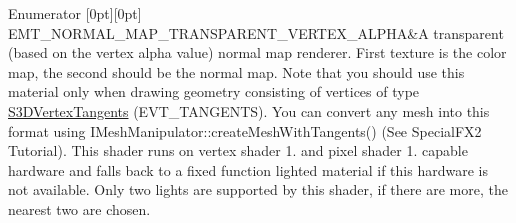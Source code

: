 \begin{DoxyEnumFields}{Enumerator}
[0pt][0pt]{}\mbox{\label{namespaceirr_1_1video_ac8e9b6c66f7cebabd1a6d30cbc5430f1ad45c2f05adf276ed6efe4b97c2a0dd04}} 
E\+M\+T\+\_\+\+N\+O\+R\+M\+A\+L\+\_\+\+M\+A\+P\+\_\+\+T\+R\+A\+N\+S\+P\+A\+R\+E\+N\+T\+\_\+\+V\+E\+R\+T\+E\+X\+\_\+\+A\+L\+P\+HA&A transparent (based on the vertex alpha value) normal map renderer. First texture is the color map, the second should be the normal map. Note that you should use this material only when drawing geometry consisting of vertices of type \hyperlink{structirr_1_1video_1_1S3DVertexTangents}{S3\+D\+Vertex\+Tangents} (E\+V\+T\+\_\+\+T\+A\+N\+G\+E\+N\+TS). You can convert any mesh into this format using I\+Mesh\+Manipulator\+::create\+Mesh\+With\+Tangents() (See Special\+F\+X2 Tutorial). This shader runs on vertex shader 1. and pixel shader 1. capable hardware and falls back to a fixed function lighted material if this hardware is not available. Only two lights are supported by this shader, if there are more, the nearest two are chosen. \\
\hline


\end{DoxyEnumFields}

